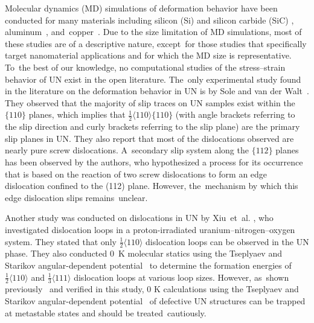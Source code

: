 \documentclass[applsci,article,accept,pdftex,moreauthors]{Definitions/mdpi}
\newcommand{\?}{\stackrel{?}{=}}
\begin{document}
Molecular dynamics (MD) simulations of deformation behavior have been conducted for many materials including silicon (Si) and silicon carbide (SiC) \cite{Ivashchenko2007}, aluminum~\cite{Li2020}, and~copper~\cite{Hansson2022}. Due to the size limitation of MD simulations, most of these studies are of a descriptive nature, except~for those studies that specifically target nanomaterial applications and for which the MD size is representative. To~the best of our knowledge, no computational studies of the stress--strain behavior of UN exist in the open literature. The~only experimental study found in the literature on the deformation behavior in UN is by Sole and van der Walt~\cite{Sole1968}. They observed that the majority of slip traces on UN samples exist within the $\{110\}$ planes, which implies that $\frac{1}{2} \langle 110 \rangle \{110\}$ (with angle brackets referring to the slip direction and curly brackets referring to the slip plane) are the primary slip planes in UN. They also report that most of the dislocations observed are nearly pure screw dislocations. A~secondary slip system along the $\{112\}$ planes has been observed by the authors, who hypothesized a process for its occurrence that is based on the reaction of two screw dislocations to form an edge dislocation confined to the (112) plane. However, the~mechanism by which this edge dislocation slips remains~unclear.

Another study was conducted on dislocations in UN by Xiu~et~al. \cite{Xiu2021}, who investigated dislocation loops in a proton-irradiated uranium--nitrogen--oxygen system. They stated that only $\frac{1}{2} \langle 110 \rangle$ dislocation loops can be observed in the UN phase. They also conducted 0~K molecular statics using the Tseplyaev and Starikov angular-dependent potential~\cite{Tseplyaev2016} to determine the formation energies of $\frac{1}{2} \langle 110 \rangle$ and $\frac{1}{3} \langle 111 \rangle$ dislocation loops at various loop sizes. However, as~shown previously~\cite{AbdulHameed2024} and verified in this study, 0 K calculations using the Tseplyaev and Starikov angular-dependent potential~\cite{Tseplyaev2016} of defective UN structures can be trapped at metastable states and should be treated~cautiously. 
\end{document}
